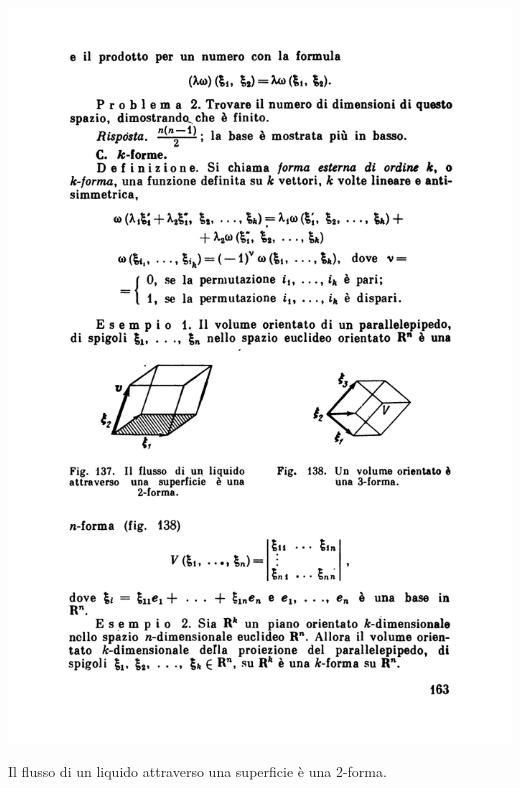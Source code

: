 \documentclass[../main.tex]{subfiles}
\begin{document}
\begin{marginfigure}[5mm]
	\includegraphics[width=1.1\linewidth]{images/arnold_164.pdf}
	\caption[Flux of a fluid as 2-form]{Il flusso di un liquido attraverso una superficie è una 2-forma.}
\end{marginfigure}
\end{document}
